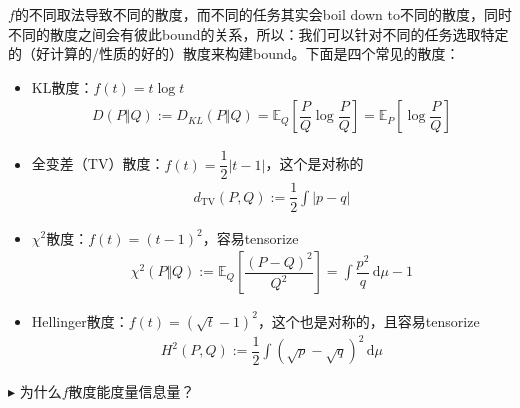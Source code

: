 \documentclass[11pt,a4paper]{ctexart}
\numberwithin{equation}{section}%
\newenvironment{point}{\raggedright$\blacktriangleright$}{}
\begin{document}
$ f $的不同取法导致不同的散度，而不同的任务其实会boil down to不同的散度，同时不同的散度之间会有彼此bound的关系，所以：我们可以针对不同的任务选取特定的（好计算的/性质的好的）散度来构建bound。下面是四个常见的散度：
\begin{itemize}[topsep=2pt,itemsep=0pt]
    \item KL散度：$ f(t)=t\log t $
    \begin{align*}
        D(P\Vert Q):=D_{KL}(P\Vert Q)= \mathbb{E}_Q\left[ \dfrac{ P }{ Q } \log \dfrac{ P  }{ Q }  \right] = \mathbb{E}_P\left[ \log \dfrac{ P  }{ Q }  \right]
    \end{align*}
    \item 全变差（TV）散度：$ f(t)=\dfrac{ 1 }{ 2 } \left\vert t-1 \right\vert  $，这个是对称的
    \begin{align*}
         d_\mathrm{ TV }(P,Q):= \dfrac{ 1 }{ 2 } \int \left\vert p-q \right\vert
    \end{align*}
    \item $ \chi^2 $散度：$ f(t)=(t-1)^2 $，容易tensorize
    \begin{align*}
        \chi^2(P\Vert Q) := \mathbb{E}_Q\left[ \dfrac{ (P-Q)^2 }{ Q^2 }  \right] = \int \dfrac{ p^2 }{ q } \,\mathrm{d}\mu -1 
    \end{align*}
    \item Hellinger散度：$ f(t)=(\sqrt{t}-1)^2 $，这个也是对称的，且容易tensorize
    \begin{align*}
        H^2(P,Q):= \dfrac{ 1 }{ 2 } \int (\sqrt{p}-\sqrt{q})^2 \,\mathrm{d}\mu 
    \end{align*}
\end{itemize}

    
\begin{point}
    为什么$ f $散度能度量信息量？
\end{point}
\end{document}
